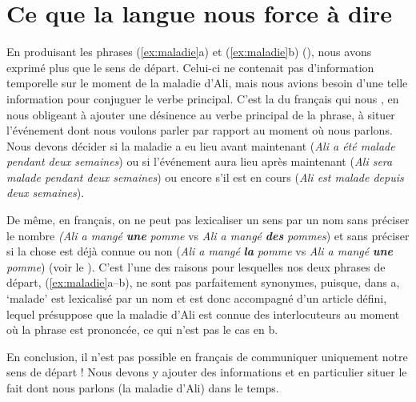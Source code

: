 \section{Ce que la langue nous force à dire}\label{sec:1.2.11}

En produisant les phrases (\ref{ex:maladie}a) et (\ref{ex:maladie}b) (), nous avons exprimé plus que le sens de départ. Celui-ci ne contenait pas d’information temporelle sur le moment de la maladie d’Ali, mais nous avions besoin d’une telle information pour conjuguer le verbe principal. C’est la  du français qui nous , en nous obligeant à ajouter une désinence au verbe principal de la phrase, à situer l’événement dont nous voulons parler par rapport au moment où nous parlons. Nous devons décider si la maladie a eu lieu avant maintenant (\textit{Ali a été malade pendant deux semaines}) ou si l’événement aura lieu après maintenant (\textit{Ali sera malade pendant deux semaines}) ou encore s’il est en cours (\textit{Ali est malade depuis deux semaines}).

De même, en français, on ne peut pas lexicaliser un sens par un nom sans préciser le nombre \textit{(Ali a mangé} \textbf{\textit{une}} \textit{pomme} vs \textit{Ali a mangé} \textbf{\textit{des}} \textit{pommes}) et sans préciser si la chose est déjà connue ou non (\textit{Ali a mangé} \textbf{\textit{la}} \textit{pomme} vs \textit{Ali a mangé} \textbf{\textit{une}} \textit{pomme}) (voir le ). C’est l’une des raisons pour lesquelles nos deux phrases de départ, (\ref{ex:maladie}a--b), ne sont pas parfaitement synonymes, puisque, dans a, ‘malade’ est lexicalisé par un nom et est donc accompagné d’un article défini, lequel présuppose que la maladie d’Ali est connue des interlocuteurs au moment où la phrase est prononcée, ce qui n’est pas le cas en b.

En conclusion, il n’est pas possible en français de communiquer uniquement notre sens de départ ! Nous devons y ajouter des informations et en particulier situer le fait dont nous parlons (la maladie d’Ali) dans le temps.\largerpage[-1]

